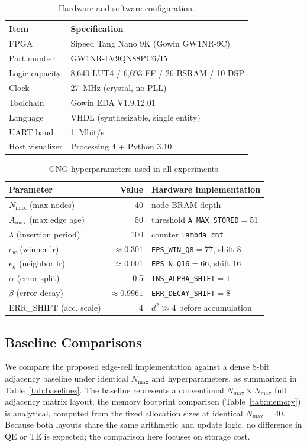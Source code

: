 \documentclass[conference]{IEEEtran}
\begin{document}
\begin{table}[t]
\caption{Hardware and software configuration.}
\label{tab:platform}
\centering
\footnotesize
\begin{tabular}{l l}
\toprule
\textbf{Item} & \textbf{Specification} \\
\midrule
FPGA & Sipeed Tang Nano 9K (Gowin GW1NR-9C) \\
Part number & GW1NR-LV9QN88PC6/I5 \\
Logic capacity & 8,640 LUT4 / 6,693 FF / 26 BSRAM / 10 DSP \\
Clock & 27~MHz (crystal, no PLL) \\
Toolchain & Gowin EDA V1.9.12.01 \\
Language & VHDL (synthesizable, single entity) \\
UART baud & 1~Mbit/s \\
Host visualizer & Processing 4 + Python 3.10 \\
\bottomrule
\end{tabular}
\end{table}

\begin{table}[t]
\caption{GNG hyperparameters used in all experiments.}
\label{tab:hyperparams}
\centering
\footnotesize
\begin{tabular}{l r l}
\toprule
\textbf{Parameter} & \textbf{Value} & \textbf{Hardware implementation} \\
\midrule
$N_{\max}$ (max nodes)       & 40    & node BRAM depth \\
$A_{\max}$ (max edge age)    & 50    & threshold \texttt{A\_MAX\_STORED}$=51$ \\
$\lambda$ (insertion period) & 100   & counter \texttt{lambda\_cnt} \\
$\epsilon_{w}$ (winner lr)   & $\approx 0.301$ & \texttt{EPS\_WIN\_Q8}$=77$, shift 8 \\
$\epsilon_{n}$ (neighbor lr) & $\approx 0.001$ & \texttt{EPS\_N\_Q16}$=66$, shift 16 \\
$\alpha$ (error split)       & 0.5   & \texttt{INS\_ALPHA\_SHIFT}$=1$ \\
$\beta$ (error decay)        & $\approx 0.9961$ & \texttt{ERR\_DECAY\_SHIFT}$=8$ \\
ERR\_SHIFT (acc. scale)      & 4     & $d^2 \gg 4$ before accumulation \\
\bottomrule
\end{tabular}
\end{table}

\subsection{Baseline Comparisons}
We compare the proposed edge-cell implementation against a dense 8-bit adjacency baseline under identical $N_{\max}$ and hyperparameters, as summarized in Table~\ref{tab:baselines}. The baseline represents a conventional $N_{\max}\!\times\!N_{\max}$ full adjacency matrix layout; the memory footprint comparison (Table~\ref{tab:memory}) is analytical, computed from the fixed allocation sizes at identical $N_{\max}=40$. Because both layouts share the same arithmetic and update logic, no difference in QE or TE is expected; the comparison here focuses on storage cost.
\end{document}
